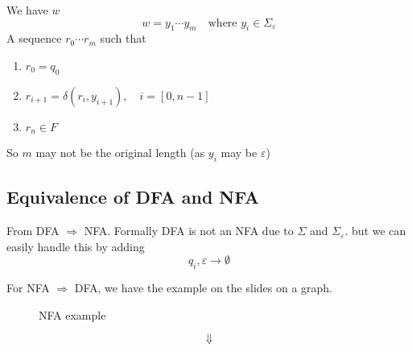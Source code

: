 \begin{theorem}
    We have $w$
    \[
        w = y_1\cdots y_m \quad \text{where } y_i \in \Sigma_{\varepsilon}
    \]
    A sequence $r_0\cdots r_m$ such that
    \begin{enumerate}[label=(\arabic*)]
        \item $r_0 = q_0$
        \item $r_{i+1} = \delta(r_i, y_{i+1}),\quad i = [0, n-1]$
        \item $r_n \in F$
    \end{enumerate}
\end{theorem}

\begin{note}
    So $m$ may not be the original length (as $y_i$ may be $\varepsilon$)
\end{note}

\subsection{Equivalence of DFA and NFA}

From DFA $\Rightarrow$ NFA. Formally DFA is not an NFA due to $\Sigma$ and $\Sigma_{\varepsilon}$. but we can easily handle this by adding
\[
    q_i, \varepsilon \rightarrow \emptyset
\]

For NFA $\Rightarrow$ DFA, we have the example on the slides on a graph.


\begin{figure}[H]
    \centering
    \caption{NFA example}
\end{figure}

\[
    \Downarrow
\]


